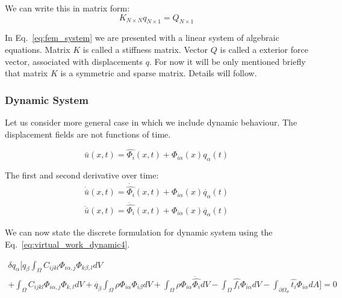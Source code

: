 \documentclass[en]{minipw} %
\begin{document}
We can write this in matrix form:
\begin{equation}
\label{eq:fem_system}
K_{N \times N} q_{N \times 1} = Q_{N \times 1}
\end{equation}

In Eq.~\ref{eq:fem_system} we are presented with a linear system of algebraic equations. Matrix $K$ is called a stiffness matrix. Vector $Q$ is called a exterior force vector, associated with displacements $q$. For now it will be only mentioned briefly that matrix $K$ is a symmetric and sparse matrix. Details will follow.

\subsubsection{Dynamic System}
Let us consider more general case in which we include dynamic behaviour. The displacement fields are not functions of time.

\begin{equation}
\bar{u}(x, t) = \hat{\Phi_i}(x, t) + \Phi_{i \alpha}(x)q_{\alpha}(t)
\end{equation}

The first and second derivative over time:
\begin{equation}
\begin{aligned}
\dot{\bar{u}}(x, t) = \dot{\hat{\Phi_i}}(x, t) + \Phi_{i \alpha}(x)\dot{q_{\alpha}}(t)
\\
\ddot{\bar{u}}(x, t) = \ddot{\hat{\Phi_i}}(x, t) + \Phi_{i \alpha}(x)\ddot{q_{\alpha}}(t)
\end{aligned}
\end{equation}

We can now state the discrete formulation for dynamic system using the Eq.~\ref{eq:virtual_work_dynamic4}.

\begin{equation}
\label{eq:virtual_work_dynamic5}
\begin{aligned}
\delta q_{\alpha}[ q_{\beta} \int_{\Omega} C_{ijkl} \Phi_{i \alpha,j} \Phi_{k \beta,l} dV 
\\
+ \int_{\Omega} C_{ijkl} \Phi_{i \alpha,j} \hat{\Phi}_{k,l} dV + \ddot{q_{\beta}} \int_{\Omega}\rho \Phi_{i \alpha} \Phi_{i \beta} dV + \int_{\Omega} \rho \Phi_{i \alpha} \ddot{\hat{\Phi_{i}}} dV - \int_{\Omega} \hat{f_i} \Phi_{i \alpha} dV - \int_{\partial \Omega_{\sigma}} \hat{t_i}\Phi_{i \alpha} dA] = 0
\end{aligned}
\end{equation}
\end{document}
